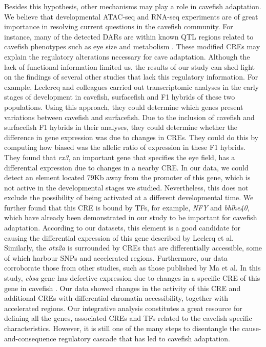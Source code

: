 Besides this hypothesis, other mechanisms may play a role in cavefish adaptation. We believe that developmental ATAC-seq and RNA-seq experiments are of great importance in resolving current questions in the cavefish community. For instance, many of the detected DARs are within known QTL regions related to cavefish phenotypes such as eye size and metabolism \parencite{mcgaugh_cavefish_2014, warren_chromosome-level_2021}. These modified CREs may explain the regulatory alterations necessary for cave adaptation. Although the lack of functional information limited us, the results of our study can shed light on the findings of several other studies that lack this regulatory information. For example, Leclercq and colleagues \parencite{leclercq_evolution_2022} carried out transcriptomic analyses in the early stages of development in cavefish, surfacefish and F1 hybrids of these two populations. Using this approach, they could determine which genes present variations between cavefish and surfacefish. Due to the inclusion of cavefish and surfacefish F1 hybrids in their analyses, they could determine whether the difference in gene expression was due to changes in CREs. They could do this by computing how biased was the allelic ratio of expression in these F1 hybrids. They found that \textit{rx3}, an important gene that specifies the eye field, has a differential expression due to changes in a nearby CRE. In our data, we could detect an element located 79Kb away from the promoter of this gene, which is not active in the developmental stages we studied. Nevertheless, this does not exclude the possibility of being activated at a different developmental time. We further found that this CRE is bound by TFs, for example, \textit{NFY} and \textit{bhlhe40}, which have already been demonstrated in our study to be important for cavefish adaptation. According to our datasets, this element is a good candidate for causing the differential expression of this gene described by Leclerq et al. Similarly, the \textit{otx2a} is surrounded by CREs that are differentially accessible, some of which harbour SNPs and accelerated regions. Furthermore, our data corroborate those from other studies, such as those published by Ma et al. In this study, \textit{cbsa} gene has defective expression due to changes in a specific CRE of this gene in cavefish \parencite{ma_hypomorphic_2020}. Our data showed changes in the activity of this CRE and additional CREs with differential chromatin accessibility, together with accelerated regions. Our integrative analysis constitutes a great resource for defining all the genes, associated CREs and TFs related to the cavefish specific characteristics. However, it is still one of the many steps to disentangle the cause-and-consequence regulatory cascade that has led to cavefish adaptation. 



